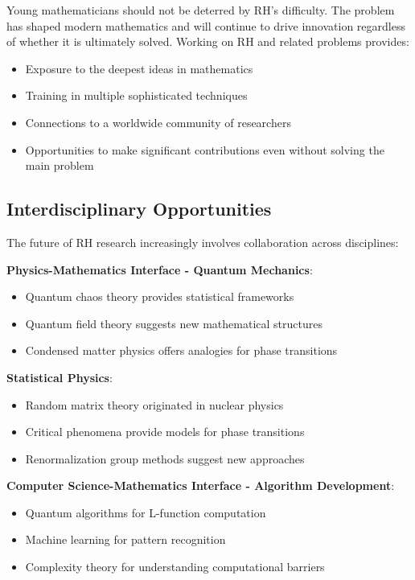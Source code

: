 \begin{encouragement}
Young mathematicians should not be deterred by RH's difficulty. The problem has shaped modern mathematics and will continue to drive innovation regardless of whether it is ultimately solved. Working on RH and related problems provides:
\end{encouragement}

\begin{itemize}
\item Exposure to the deepest ideas in mathematics
\item Training in multiple sophisticated techniques
\item Connections to a worldwide community of researchers
\item Opportunities to make significant contributions even without solving the main problem
\end{itemize}

\subsection{Interdisciplinary Opportunities}
\label{subsec:interdisciplinary}

The future of RH research increasingly involves collaboration across disciplines:

\noindent\textbf{Physics-Mathematics Interface - Quantum Mechanics}: 
\begin{itemize}
\item Quantum chaos theory provides statistical frameworks
\item Quantum field theory suggests new mathematical structures
\item Condensed matter physics offers analogies for phase transitions
\end{itemize}

\textbf{Statistical Physics}:
\begin{itemize}
\item Random matrix theory originated in nuclear physics
\item Critical phenomena provide models for phase transitions
\item Renormalization group methods suggest new approaches
\end{itemize}

\noindent\textbf{Computer Science-Mathematics Interface - Algorithm Development}:
\begin{itemize}
\item Quantum algorithms for L-function computation
\item Machine learning for pattern recognition
\item Complexity theory for understanding computational barriers
\end{itemize}

